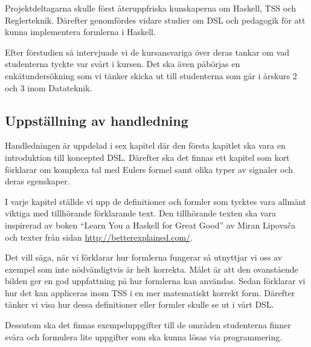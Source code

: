 \documentclass[]{article}
\begin{document}
Projektdeltagarna skulle först återuppfriska kunskaperna om Haskell, TSS
och Reglerteknik. Därefter genomfördes vidare studier om DSL och pedagogik för
att kunna implementera formlerna i Haskell.

Efter förstudien så intervjuade vi de kursansvariga över deras tankar om vad
studenterna tyckte var svårt i kursen. Det ska även påbörjas en
enkätundersökning som vi tänker skicka ut till studenterna som går i årskurs
2 och 3 inom Datateknik.


\subsection{Uppställning av handledning}

Handledningen är uppdelad i sex kapitel %
där den första kapitlet ska vara en introduktion till koncepted DSL.
Därefter ska det finnas ett kapitel som kort förklarar om komplexa tal
med Eulers formel samt olika typer av signaler och deras egenskaper.


I varje kapitel ställde vi upp de definitioner och formler som tycktes
vara allmänt viktiga med tillhörande förklarande text. Den tillhörande
texten ska vara inspirerad av boken ``Learn You a Haskell for Great
Good'' av Miran Lipovača \cite{learnyouahaskell} och texter från sidan
\url{http://betterexplained.com/}.

Det vill säga, när vi förklarar hur formlerna fungerar så utnyttjar vi
oss av exempel som inte nödvändigtvis är helt korrekta. Målet är
att den ovanstående bilden ger en god uppfattning på hur formlerna kan användas.
Sedan förklarar vi hur det kan appliceras inom TSS i en mer matematiskt korrekt
form. Därefter tänker vi visa hur dessa definitioner eller formler skulle
se ut i vårt DSL.

Dessutom ska det finnas exempeluppgifter till de områden studenterna finner
svåra och formulera lite uppgifter som ska kunna lösas via programmering.
\end{document}
